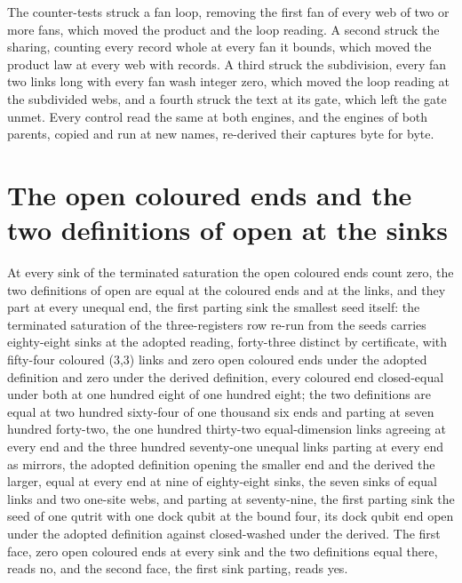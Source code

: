 \begin{chproof}[census]
The counter-tests struck a fan loop, removing the first fan of every web of two or more fans, which moved the product and the loop reading. A second struck the sharing, counting every record whole at every fan it bounds, which moved the product law at every web with records. A third struck the subdivision, every fan two links long with every fan wash integer zero, which moved the loop reading at the subdivided webs, and a fourth struck the text at its gate, which left the gate unmet. Every control read the same at both engines, and the engines of both parents, copied and run at new names, re-derived their captures byte for byte.
\end{chproof}
\section{The open coloured ends and the two definitions of open at the sinks}\label{mod:I-5-D543074-w-otts}
\begin{chwall}\label{box:I-5-D543074-w-otts:1}
At every sink of the terminated saturation the open coloured ends count zero, the two definitions of open are equal at the coloured ends and at the links, and they part at every unequal end, the first parting sink the smallest seed itself: the terminated saturation of the three-registers row re-run from the seeds carries eighty-eight sinks at the adopted reading, forty-three distinct by certificate, with fifty-four coloured (3,3) links and zero open coloured ends under the adopted definition and zero under the derived definition, every coloured end closed-equal under both at one hundred eight of one hundred eight; the two definitions are equal at two hundred sixty-four of one thousand six ends and parting at seven hundred forty-two, the one hundred thirty-two equal-dimension links agreeing at every end and the three hundred seventy-one unequal links parting at every end as mirrors, the adopted definition opening the smaller end and the derived the larger, equal at every end at nine of eighty-eight sinks, the seven sinks of equal links and two one-site webs, and parting at seventy-nine, the first parting sink the seed of one qutrit with one dock qubit at the bound four, its dock qubit end open under the adopted definition against closed-washed under the derived. The first face, zero open coloured ends at every sink and the two definitions equal there, reads no, and the second face, the first sink parting, reads yes.
\end{chwall}
